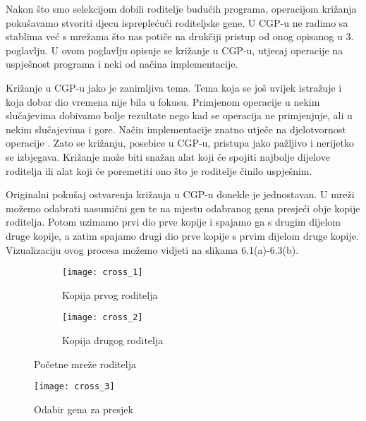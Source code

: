 \quad Nakon što smo selekcijom dobili roditelje budućih programa, operacijom križanja pokušavamo stvoriti djecu ispreplećući roditeljske gene. U CGP-u ne radimo sa stablima već s mrežama što nas potiče na drukčiji pristup od onog opisanog u 3. poglavlju. U ovom poglavlju opisuje se križanje u CGP-u, utjecaj operacije na uspješnost programa i neki od načina implementacije.

\par
Križanje u CGP-u jako je zanimljiva tema. Tema koja se još uvijek istražuje i koja dobar dio vremena nije bila u fokusu. Primjenom operacije u nekim slučajevima dobivamo bolje rezultate nego kad se operacija ne primjenjuje, ali u nekim slučajevima i gore. Način implementacije znatno utječe na djelotvornost operacije \cite{CGPbook}\cite{CGPpresentation}. Zato se križanju, posebice u CGP-u, pristupa jako pažljivo i nerijetko se izbjegava. Križanje može biti snažan alat koji će spojiti najbolje dijelove roditelja ili alat koji će poremetiti ono što je roditelje činilo uspješnim.
\par
Originalni pokušaj ostvarenja križanja u CGP-u donekle je jednostavan. U mreži možemo odabrati nasumični gen te na mjestu odabranog gena presjeći obje kopije roditelja. Potom uzimamo prvi dio prve kopije i spajamo ga s drugim dijelom druge kopije, a zatim spajamo drugi dio prve kopije s prvim dijelom druge kopije. Vizualizaciju ovog procesa možemo vidjeti na slikama 6.1(a)-6.3(b).
\begin{figure}[h]
	\centering
	\begin{subfigure}{0.4\textwidth}
		\texttt{[image: cross\_1]} 
		\caption{Kopija prvog roditelja}
	\end{subfigure}
	\begin{subfigure}{0.4\textwidth}
		{\texttt{[image: cross\_2]}}
		\caption{Kopija drugog roditelja}
	\end{subfigure}
	\caption{Početne mreže roditelja }
\end{figure}

 \begin{figure}[h]
	\centering
	\texttt{[image: cross\_3]}
	\caption{Odabir gena za presjek}
\end{figure}

